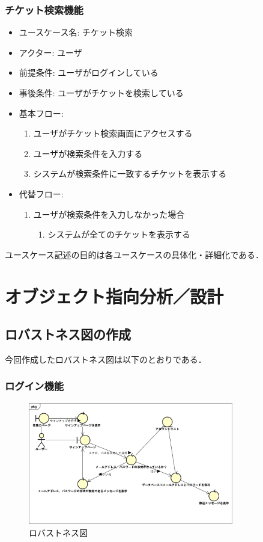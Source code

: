 \documentclass{ltjsarticle}
\begin{document}
\subsubsection{チケット検索機能}
\begin{itemize}
    \item ユースケース名: チケット検索
    \item アクター: ユーザ
    \item 前提条件: ユーザがログインしている
    \item 事後条件: ユーザがチケットを検索している
    \item 基本フロー:
    \begin{enumerate}
        \item ユーザがチケット検索画面にアクセスする
        \item ユーザが検索条件を入力する
        \item システムが検索条件に一致するチケットを表示する
    \end{enumerate}
    \item 代替フロー:
    \begin{enumerate}
        \item ユーザが検索条件を入力しなかった場合
        \begin{enumerate}
            \item システムが全てのチケットを表示する
        \end{enumerate}
    \end{enumerate}
\end{itemize}

ユースケース記述の目的は各ユースケースの具体化・詳細化である．

\section{オブジェクト指向分析／設計}
\subsection{ロバストネス図の作成}
今回作成したロバストネス図は以下のとおりである．
\subsubsection{ログイン機能}
\begin{figure}[H]
    \centering
    \includegraphics[width=0.8\textwidth]{src/Robustness.png}
    \caption{ロバストネス図}
    \label{fig:robustness}
\end{figure}
\end{document}
